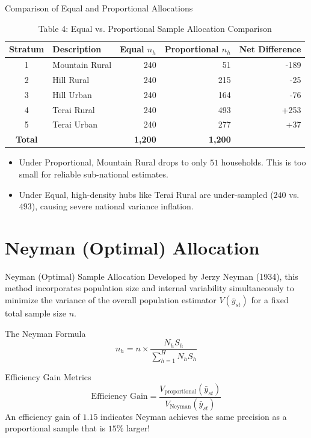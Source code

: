 \documentclass[10pt, aspectratio=169]{beamer}
\begin{document}
  \begin{frame}{Comparison of Equal and Proportional Allocations}
      \begin{table}
          \caption{Table 4: Equal vs. Proportional Sample Allocation Comparison}
          \small
          \begin{tabularx}{0.85\textwidth}{clrrr}
              \toprule
              \textbf{Stratum} & \textbf{Description} & \textbf{Equal $n_h$} & \textbf{Proportional $n_h$} & \textbf{Net Difference} \\
              \midrule
              1 & Mountain Rural & 240 & 51 & -189 \\
              2 & Hill Rural & 240 & 215 & -25 \\
              3 & Hill Urban & 240 & 164 & -76 \\
              4 & Terai Rural & 240 & 493 & +253 \\
              5 & Terai Urban & 240 & 277 & +37 \\
              \midrule
              \textbf{Total} & & \textbf{1,200} & \textbf{1,200} & \\
              \bottomrule
          \end{tabularx}
      \end{table}
      \begin{itemize}
          \item Under Proportional, Mountain Rural drops to only $51$ households. This is too small for reliable sub-national estimates.
          \item Under Equal, high-density hubs like Terai Rural are under-sampled ($240$ vs. $493$), causing severe national variance inflation.
      \end{itemize}
  \end{frame}
  
  \section{Neyman (Optimal) Allocation}
  
  \begin{frame}{Neyman (Optimal) Sample Allocation}
      Developed by Jerzy Neyman (1934), this method incorporates population size and internal variability simultaneously to minimize the variance of the overall population estimator $V(\bar{y}_{st})$ for a fixed total sample size $n$.
      
      \begin{block}{The Neyman Formula}
          $$n_h = n \times \frac{N_h S_h}{\sum_{h=1}^H N_h S_h}$$
      \end{block}
      \begin{block}{Efficiency Gain Metrics}
          $$\text{Efficiency Gain} = \frac{V_{\text{proportional}}(\bar{y}_{st})}{V_{\text{Neyman}}(\bar{y}_{st})}$$
          An efficiency gain of $1.15$ indicates Neyman achieves the same precision as a proportional sample that is $15\%$ larger!
      \end{block}
  \end{frame}
  
\end{document}
